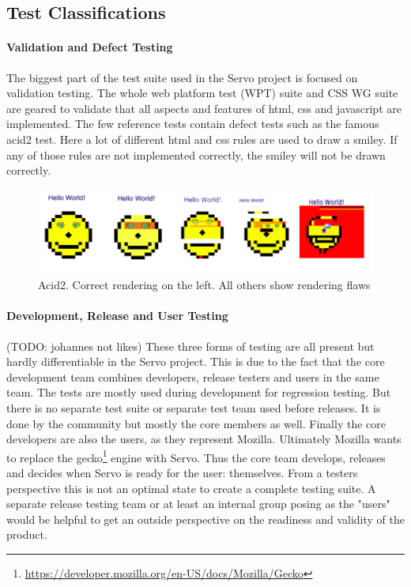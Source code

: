 \documentclass{scrartcl}
\newcommand{\todo}[1] {{\color{red}(TODO: #1)}}
\begin{document}
\subsection{Test Classifications}

\paragraph{Validation and Defect Testing}
The biggest part of the test suite used in the Servo project is focused on validation testing. The whole web platform test (WPT) suite and CSS WG suite are geared to validate that all aspects and features of html, css and javascript are implemented. The few reference tests contain defect tests such as the famous acid2 test. Here a lot of different html and css rules are used to draw a smiley. If any of those rules are not implemented correctly, the smiley will not be drawn correctly.

\begin{figure}[h]
    \centering
    \includegraphics[width=\textwidth]{acid2}
    \caption{Acid2. Correct rendering on the left. All others show rendering flaws}
\end{figure}

\paragraph{Development, Release and User Testing}
\todo{johannes not likes}
These three forms of testing are all present but hardly differentiable in the Servo project. This is due to the fact that the core development team combines developers, release testers and users in the same team. The tests are mostly used during development for regression testing. But there is no separate test suite or separate test team used before releases. It is done by the community but mostly the core members as well. Finally the core developers are also the users, as they represent Mozilla. Ultimately Mozilla wants to replace the gecko\footnote{\url{https://developer.mozilla.org/en-US/docs/Mozilla/Gecko}} engine with Servo. Thus the core team develops, releases and decides when Servo is ready for the user: themselves. From a testers perspective this is not an optimal state to create a complete testing suite. A separate release testing team or at least an internal group posing as the "users" would be helpful to get an outside perspective on the readiness and validity of the product.
\end{document}
